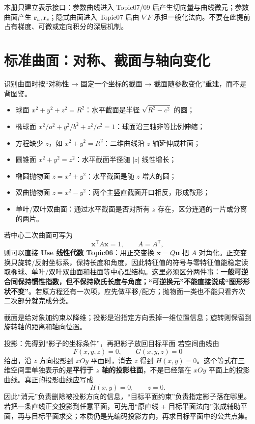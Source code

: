\documentclass[11pt,a4paper]{ctexart}
\begin{document}
本册只建立表示接口：参数曲线进入 Topic07/09 后产生切向量与曲线微元；参数曲面产生 $\mathbf r_u,\mathbf r_v$；隐式曲面进入 Topic07 后由 $\nabla F$ 承担一般化法向。不要在此提前占有梯度、可微或定向积分的深层机制。

\section{标准曲面：对称、截面与轴向变化}

识别曲面时按“对称性 → 固定一个坐标的截面 → 截面随参数变化”重建，而不是背图鉴。

\begin{itemize}
  \item 球面 $x^2+y^2+z^2=R^2$：水平截面是半径 $\sqrt{R^2-c^2}$ 的圆；
  \item 椭球面 $x^2/a^2+y^2/b^2+z^2/c^2=1$：球面沿三轴非等比例伸缩；
  \item 方程缺少 $z$，如 $x^2+y^2=R^2$：二维曲线沿 $z$ 轴延伸成柱面；
  \item 圆锥面 $x^2+y^2=z^2$：水平截面半径随 $\lvert z\rvert$ 线性增长；
  \item 椭圆抛物面 $z=x^2+y^2$：水平截面是随 $z$ 增大的圆；
  \item 双曲抛物面 $z=x^2-y^2$：两个主竖直截面开口相反，形成鞍形；
  \item 单叶/双叶双曲面：通过水平截面是否对所有 $z$ 存在，区分连通的一片或分离的两片。
\end{itemize}

若中心二次曲面可写为
\[
\mathbf x^{\mathsf T}A\mathbf x=1,\qquad A=A^{\mathsf T},
\]
则可以直接 \textbf{Use 线性代数 Topic06}：用正交变换 $\mathbf x=Q\mathbf u$ 把 $A$ 对角化。正交变换只旋转/反射坐标系，保持长度和角度，因此特征值的符号与零特征值能稳定读取椭球、单叶/双叶双曲面和柱面等中心型结构。这里必须区分两件事：\textbf{一般可逆合同保持惯性指数，但不保持欧氏长度与角度；“可逆换元”不能直接说成“图形形状不变”}。若原方程还有一次项，应先做平移/配方；抛物面一类也不能只看齐次二次部分就完成分类。

截面是给对象加约束以降维；投影是沿指定方向丢掉一维位置信息；旋转则保留到旋转轴的距离和轴向位置。

\begin{corebox}{投影：先得到“影子的坐标条件”，再把影子放回目标平面}
若空间曲线由
\[
F(x,y,z)=0,\qquad G(x,y,z)=0
\]
给出，沿 $z$ 方向投影到 $xOy$ 平面时，消去 $z$ 得到 $H(x,y)=0$。这个等式在三维空间里单独表示的是\textbf{平行于 $z$ 轴的投影柱面}，不是已经落在 $xOy$ 平面上的投影曲线。真正的投影曲线应写成
\[
\boxed{H(x,y)=0,\qquad z=0}.
\]
因此“消元”负责删除被投影方向的信息，“目标平面约束”负责指定影子落在哪里。若把一条直线正交投影到任意平面，可先用“原直线 + 目标平面法向”张成辅助平面，再与目标平面求交；本质仍是先编码投影方向，再求目标平面中的公共点集。
\end{corebox}
\end{document}
